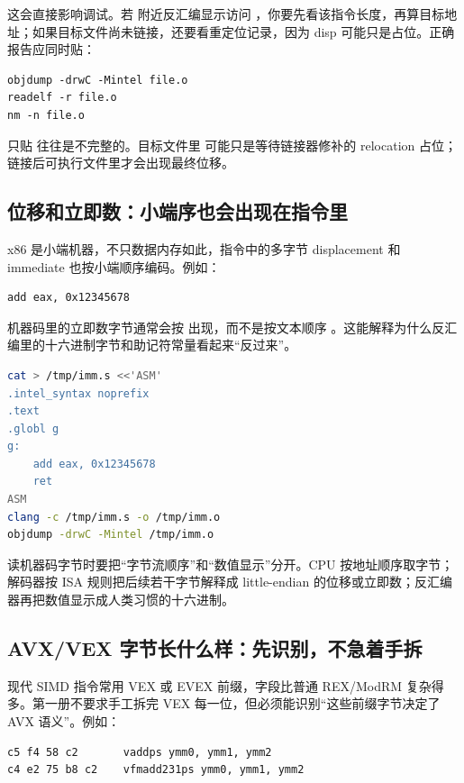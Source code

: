 这会直接影响调试。若  附近反汇编显示访问 ，你要先看该指令长度，再算目标地址；如果目标文件尚未链接，还要看重定位记录，因为 disp 可能只是占位。正确报告应同时贴：

\begin{lstlisting}[numbers=none,caption={RIP-relative 证据包}]
objdump -drwC -Mintel file.o
readelf -r file.o
nm -n file.o
\end{lstlisting}

只贴  往往是不完整的。目标文件里  可能只是等待链接器修补的 relocation 占位；链接后可执行文件里才会出现最终位移。

\subsection{位移和立即数：小端序也会出现在指令里}

x86 是小端机器，不只数据内存如此，指令中的多字节 displacement 和 immediate 也按小端顺序编码。例如：

\begin{lstlisting}
add eax, 0x12345678
\end{lstlisting}

机器码里的立即数字节通常会按  出现，而不是按文本顺序 。这能解释为什么反汇编里的十六进制字节和助记符常量看起来“反过来”。

\begin{lstlisting}[language=bash,caption={观察立即数小端编码}]
cat > /tmp/imm.s <<'ASM'
.intel_syntax noprefix
.text
.globl g
g:
    add eax, 0x12345678
    ret
ASM
clang -c /tmp/imm.s -o /tmp/imm.o
objdump -drwC -Mintel /tmp/imm.o
\end{lstlisting}

读机器码字节时要把“字节流顺序”和“数值显示”分开。CPU 按地址顺序取字节；解码器按 ISA 规则把后续若干字节解释成 little-endian 的位移或立即数；反汇编器再把数值显示成人类习惯的十六进制。

\subsection{AVX/VEX 字节长什么样：先识别，不急着手拆}

现代 SIMD 指令常用 VEX 或 EVEX 前缀，字段比普通 REX/ModRM 复杂得多。第一册不要求手工拆完 VEX 每一位，但必须能识别“这些前缀字节决定了 AVX 语义”。例如：

\begin{lstlisting}[numbers=none]
c5 f4 58 c2       vaddps ymm0, ymm1, ymm2
c4 e2 75 b8 c2    vfmadd231ps ymm0, ymm1, ymm2
\end{lstlisting}

